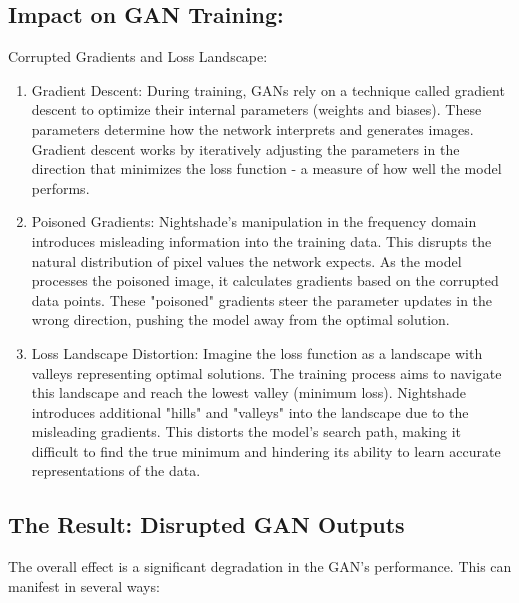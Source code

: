 \documentclass{article}
\begin{document}
\subsection{Impact on GAN Training:}

Corrupted Gradients and Loss Landscape:

\begin{enumerate}
      \item Gradient Descent: During training, GANs rely on a technique called gradient
            descent to optimize their internal parameters (weights and biases). These
            parameters determine how the network interprets and generates images. Gradient
            descent works by iteratively adjusting the parameters in the direction that
            minimizes the loss function - a measure of how well the model performs.

      \item Poisoned Gradients: Nightshade's manipulation in the frequency domain
            introduces misleading information into the training data. This disrupts the
            natural distribution of pixel values the network expects. As the model
            processes the poisoned image, it calculates gradients based on the corrupted
            data points. These "poisoned" gradients steer the parameter updates in the
            wrong direction, pushing the model away from the optimal solution.

      \item Loss Landscape Distortion: Imagine the loss function as a landscape with
            valleys representing optimal solutions. The training process aims to navigate
            this landscape and reach the lowest valley (minimum loss). Nightshade
            introduces additional "hills" and "valleys" into the landscape due to the
            misleading gradients. This distorts the model's search path, making it
            difficult to find the true minimum and hindering its ability to learn accurate
            representations of the data.
\end{enumerate}

\subsection{The Result: Disrupted GAN Outputs}

The overall effect is a significant degradation in the GAN's performance. This
can manifest in several ways:
\end{document}
